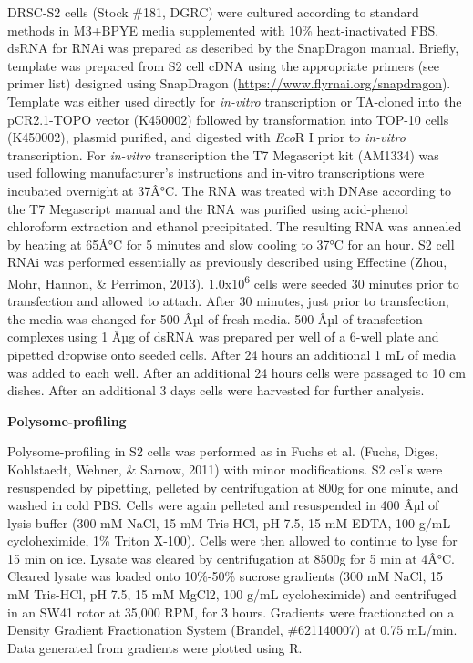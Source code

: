 \documentclass[12pt,oneside]{reedthesis}
\begin{document}
DRSC-S2 cells (Stock \#181, DGRC) were cultured according to standard
methods in M3+BPYE media supplemented with 10\% heat-inactivated FBS.
dsRNA for RNAi was prepared as described by the SnapDragon manual.
Briefly, template was prepared from S2 cell cDNA using the appropriate
primers (see primer list) designed using SnapDragon
(\url{https://www.flyrnai.org/snapdragon}). Template was either used
directly for \emph{in-vitro} transcription or TA-cloned into the pCR2.1-TOPO
vector (K450002) followed by transformation into TOP-10 cells (K450002),
plasmid purified, and digested with \emph{Eco}R I prior to \emph{in-vitro}
transcription. For \emph{in-vitro} transcription the T7 Megascript kit
(AM1334) was used following manufacturer's instructions and in-vitro
transcriptions were incubated overnight at 37Â°C. The RNA was treated
with DNAse according to the T7 Megascript manual and the RNA was
purified using acid-phenol chloroform extraction and ethanol
precipitated. The resulting RNA was annealed by heating at 65Â°C for 5
minutes and slow cooling to 37°C for an hour. S2 cell RNAi was performed
essentially as previously described using Effectine
(Zhou, Mohr, Hannon, \& Perrimon, 2013). 1.0x10\textsuperscript{6} cells were seeded 30
minutes prior to transfection and allowed to attach. After 30 minutes,
just prior to transfection, the media was changed for 500 Âµl of fresh
media. 500 Âµl of transfection complexes using 1 Âµg of dsRNA was prepared
per well of a 6-well plate and pipetted dropwise onto seeded cells.
After 24 hours an additional 1 mL of media was added to each well. After
an additional 24 hours cells were passaged to 10 cm dishes. After an
additional 3 days cells were harvested for further analysis.

\textbf{Polysome-profiling}

Polysome-profiling in S2 cells was performed as in Fuchs et al.
(Fuchs, Diges, Kohlstaedt, Wehner, \& Sarnow, 2011) with minor modifications. S2
cells were resuspended by pipetting, pelleted by centrifugation at 800g
for one minute, and washed in cold PBS. Cells were again pelleted and
resuspended in 400 Âµl of lysis buffer (300 mM NaCl, 15 mM Tris-HCl, pH
7.5, 15 mM EDTA, 100 g/mL cycloheximide, 1\% Triton X-100). Cells were
then allowed to continue to lyse for 15 min on ice. Lysate was cleared
by centrifugation at 8500g for 5 min at 4Â°C. Cleared lysate was loaded
onto 10\%-50\% sucrose gradients (300 mM NaCl, 15 mM Tris-HCl, pH 7.5, 15
mM MgCl2, 100 g/mL cycloheximide) and centrifuged in an SW41 rotor at
35,000 RPM, for 3 hours. Gradients were fractionated on a Density
Gradient Fractionation System (Brandel, \#621140007) at 0.75 mL/min.
Data generated from gradients were plotted using R.
\end{document}
